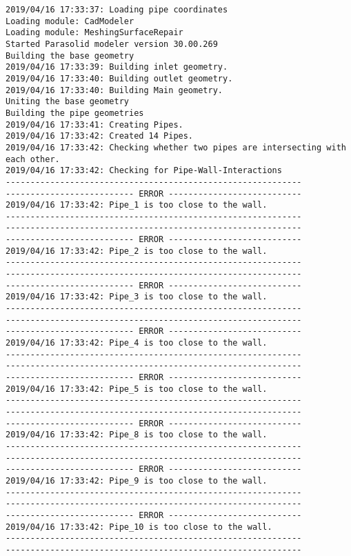 \documentclass{article}
\begin{document}
{\tiny 
\begin{verbatim}
2019/04/16 17:33:37: Loading pipe coordinates
Loading module: CadModeler
Loading module: MeshingSurfaceRepair
Started Parasolid modeler version 30.00.269
Building the base geometry
2019/04/16 17:33:39: Building inlet geometry.
2019/04/16 17:33:40: Building outlet geometry.
2019/04/16 17:33:40: Building Main geometry.
Uniting the base geometry
Building the pipe geometries
2019/04/16 17:33:41: Creating Pipes.
2019/04/16 17:33:42: Created 14 Pipes.
2019/04/16 17:33:42: Checking whether two pipes are intersecting with each other.
2019/04/16 17:33:42: Checking for Pipe-Wall-Interactions
------------------------------------------------------------
-------------------------- ERROR ---------------------------
2019/04/16 17:33:42: Pipe_1 is too close to the wall.
------------------------------------------------------------
------------------------------------------------------------
-------------------------- ERROR ---------------------------
2019/04/16 17:33:42: Pipe_2 is too close to the wall.
------------------------------------------------------------
------------------------------------------------------------
-------------------------- ERROR ---------------------------
2019/04/16 17:33:42: Pipe_3 is too close to the wall.
------------------------------------------------------------
------------------------------------------------------------
-------------------------- ERROR ---------------------------
2019/04/16 17:33:42: Pipe_4 is too close to the wall.
------------------------------------------------------------
------------------------------------------------------------
-------------------------- ERROR ---------------------------
2019/04/16 17:33:42: Pipe_5 is too close to the wall.
------------------------------------------------------------
------------------------------------------------------------
-------------------------- ERROR ---------------------------
2019/04/16 17:33:42: Pipe_8 is too close to the wall.
------------------------------------------------------------
------------------------------------------------------------
-------------------------- ERROR ---------------------------
2019/04/16 17:33:42: Pipe_9 is too close to the wall.
------------------------------------------------------------
------------------------------------------------------------
-------------------------- ERROR ---------------------------
2019/04/16 17:33:42: Pipe_10 is too close to the wall.
------------------------------------------------------------
------------------------------------------------------------

\end{verbatim}}
\end{document}
